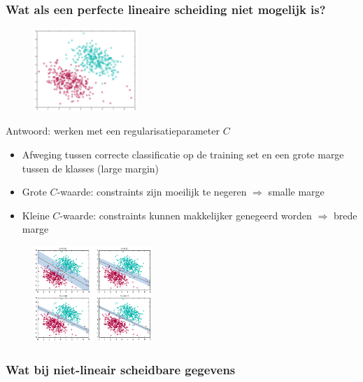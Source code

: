 \documentclass{article}
\begin{document}
\subsubsection{Wat als een perfecte lineaire scheiding niet mogelijk is?}

\begin{figure}[H]
    \centering
    \includegraphics[width=0.35\textwidth]{svm-perfect-onmogelijk.png}
    \caption{}
\end{figure}

Antwoord: werken met een regularisatieparameter $C$

\begin{itemize}
    \item Afweging tussen correcte classificatie op de training set en een grote marge tussen de klasses (large margin)
    \item Grote $C$-waarde: constraints zijn moeilijk te negeren $\Rightarrow$ smalle marge
    \item Kleine $C$-waarde: constraints kunnen makkelijker genegeerd worden $\Rightarrow$ brede marge
\end{itemize}

\begin{figure}[H]
    \centering
    \includegraphics[width=0.4\textwidth]{svm-regularisatie.png}
    \caption{}
\end{figure}

\subsubsection{Wat bij niet-lineair scheidbare gegevens}
\end{document}
